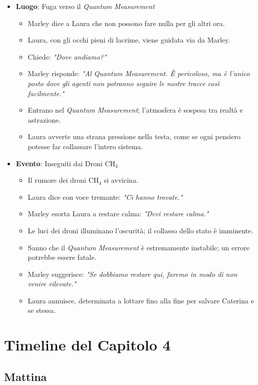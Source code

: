 \begin{itemize}
    \item \textbf{Luogo}: Fuga verso il \emph{Quantum Measurement}
    \begin{itemize}
        \item Marley dice a Laura che non possono fare nulla per gli altri ora.
        \item Laura, con gli occhi pieni di lacrime, viene guidata via da Marley.
        \item Chiede: \emph{"Dove andiamo?"}
        \item Marley risponde: \emph{"Al Quantum Measurement. È pericoloso, ma è l'unico posto dove gli agenti non potranno seguire le nostre tracce così facilmente."}
        \item Entrano nel \emph{Quantum Measurement}; l'atmosfera è sospesa tra realtà e astrazione.
        \item Laura avverte una strana pressione nella testa, come se ogni pensiero potesse far collassare l'intero sistema.
    \end{itemize}
    \item \textbf{Evento}: Inseguiti dai Droni CH$_4$
    \begin{itemize}
        \item Il rumore dei droni CH$_4$ si avvicina.
        \item Laura dice con voce tremante: \emph{"Ci hanno trovate."}
        \item Marley esorta Laura a restare calma: \emph{"Devi restare calma."}
        \item Le luci dei droni illuminano l'oscurità; il collasso dello stato è imminente.
        \item Sanno che il \emph{Quantum Measurement} è estremamente instabile; un errore potrebbe essere fatale.
        \item Marley suggerisce: \emph{"Se dobbiamo restare qui, faremo in modo di non venire rilevate."}
        \item Laura annuisce, determinata a lottare fino alla fine per salvare Caterina e se stessa.
    \end{itemize}
\end{itemize}
\section*{Timeline del Capitolo 4}

\subsection*{Mattina}


